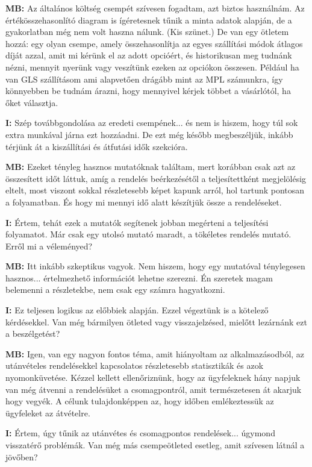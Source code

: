 \documentclass{imc-inf}
\begin{document}
\begin{appendices}
  \noindent\textbf{MB:} Az általános költség csempét szívesen fogadtam, azt biztos használnám. Az értékösszehasonlító diagram is ígéretesnek tűnik a minta adatok alapján, de a gyakorlatban még nem volt haszna nálunk. (Kis szünet.) De van egy ötletem hozzá: egy olyan csempe, amely összehasonlítja az egyes szállítási módok átlagos díját azzal, amit mi kérünk el az adott opcióért, és historikusan meg tudnánk nézni, mennyit nyerünk vagy veszítünk ezeken az opciókon összesen. Például ha van GLS szállításom ami alapvetően drágább mint az MPL számunkra, így könnyebben be tudnám árazni, hogy mennyivel kérjek többet a vásárlótól, ha őket választja.

  \noindent\textbf{I:} Szép továbbgondolása az eredeti csempének... és nem is hiszem, hogy túl sok extra munkával járna ezt hozzáadni. De ezt még később megbeszéljük, inkább térjünk át a kiszállítási és átfutási idők szekcióra.

  \noindent\textbf{MB:} Ezeket tényleg hasznos mutatóknak találtam, mert korábban csak azt az összesített időt láttuk, amíg a rendelés beérkezésétől a teljesítettként megjelölésig eltelt, most viszont sokkal részletesebb képet kapunk arról, hol tartunk pontosan a folyamatban. És hogy mi mennyi idő alatt készítjük össze a rendeléseket.

  \noindent\textbf{I:} Értem, tehát ezek a mutatók segítenek jobban megérteni a teljesítési folyamatot. Már csak egy utolsó mutató maradt, a tökéletes rendelés mutató. Erről mi a véleményed?

  \noindent\textbf{MB:} Itt inkább szkeptikus vagyok. Nem hiszem, hogy egy mutatóval ténylegesen hasznos... értelmezhető információt lehetne szerezni. Én szeretek magam belemenni a részletekbe, nem csak egy számra hagyatkozni.

  \noindent\textbf{I:} Ez teljesen logikus az előbbiek alapján. Ezzel végeztünk is a kötelező kérdésekkel. Van még bármilyen ötleted vagy visszajelzésed, mielőtt lezárnánk ezt a beszélgetést?

  \noindent\textbf{MB:} Igen, van egy nagyon fontos téma, amit hiányoltam az alkalmazásodból, az utánvételes rendelésekkel kapcsolatos részletesebb statisztikák és azok nyomonküvetése. Kézzel kellett ellenőriznünk, hogy az ügyfeleknek hány napjuk van még átvenni a rendelésüket a csomagpontról, amit természetesen át akarjuk hogy vegyék. A célunk tulajdonképpen az, hogy időben emlékeztessük az ügyfeleket az átvételre.

  \noindent\textbf{I:} Értem, úgy tűnik az utánvétes és csomagpontos rendelések... úgymond visszatérő problémák. Van még más csempeötleted esetleg, amit szívesen látnál a jövőben?


\end{appendices}
\end{document}
